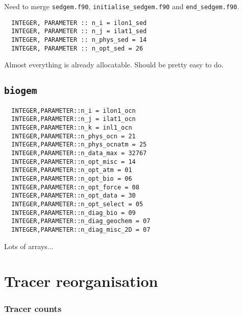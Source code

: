 \documentclass[a4paper,10pt,article]{memoir}
\begin{document}
Need to merge \texttt{sedgem.f90}, \texttt{initialise\_sedgem.f90} and
\texttt{end\_sedgem.f90}.

\begin{verbatim}
  INTEGER, PARAMETER :: n_i = ilon1_sed
  INTEGER, PARAMETER :: n_j = ilat1_sed
  INTEGER, PARAMETER :: n_phys_sed = 14
  INTEGER, PARAMETER :: n_opt_sed = 26
\end{verbatim}

Almost everything is already allocatable.  Should be pretty easy to
do.

\section{\texttt{biogem}}

\begin{verbatim}
  INTEGER,PARAMETER::n_i = ilon1_ocn
  INTEGER,PARAMETER::n_j = ilat1_ocn
  INTEGER,PARAMETER::n_k = inl1_ocn
  INTEGER,PARAMETER::n_phys_ocn = 21
  INTEGER,PARAMETER::n_phys_ocnatm = 25
  INTEGER,PARAMETER::n_data_max = 32767
  INTEGER,PARAMETER::n_opt_misc = 14
  INTEGER,PARAMETER::n_opt_atm = 01
  INTEGER,PARAMETER::n_opt_bio = 06
  INTEGER,PARAMETER::n_opt_force = 08
  INTEGER,PARAMETER::n_opt_data = 30
  INTEGER,PARAMETER::n_opt_select = 05
  INTEGER,PARAMETER::n_diag_bio = 09
  INTEGER,PARAMETER::n_diag_geochem = 07
  INTEGER,PARAMETER::n_diag_misc_2D = 07
\end{verbatim}

Lots of arrays...



\chapter{Tracer reorganisation}

\subsection*{Tracer counts}
\end{document}
